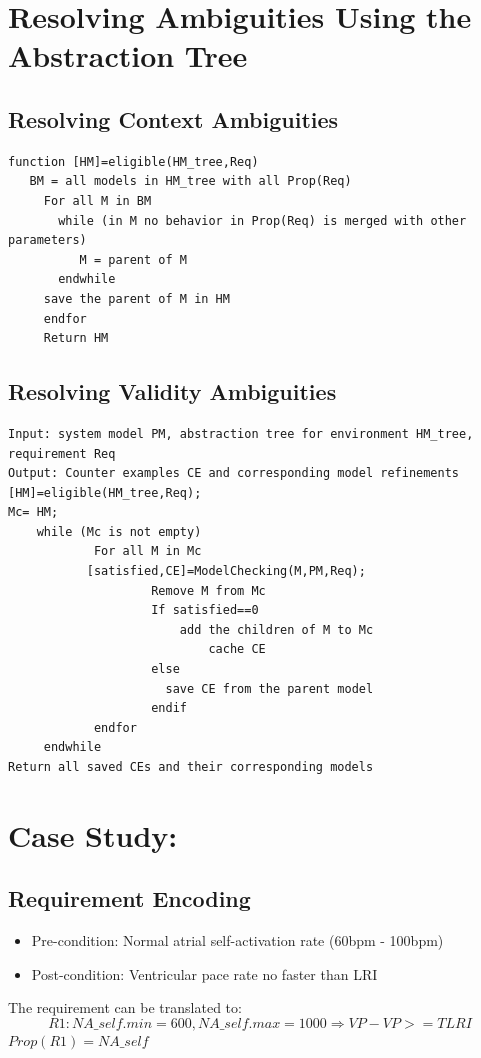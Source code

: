 \section{Resolving Ambiguities Using the Abstraction Tree}
\subsection{Resolving Context Ambiguities}
\begin{Verbatim}
function [HM]=eligible(HM_tree,Req)
   BM = all models in HM_tree with all Prop(Req)
	 For all M in BM
	   while (in M no behavior in Prop(Req) is merged with other parameters)
	      M = parent of M
	   endwhile
	 save the parent of M in HM
	 endfor
	 Return HM
\end{Verbatim}

\subsection{Resolving Validity Ambiguities}

\begin{Verbatim}
Input: system model PM, abstraction tree for environment HM_tree, requirement Req
Output: Counter examples CE and corresponding model refinements
[HM]=eligible(HM_tree,Req);
Mc= HM;
    while (Mc is not empty)
		    For all M in Mc
           [satisfied,CE]=ModelChecking(M,PM,Req);
					Remove M from Mc
					If satisfied==0
					    add the children of M to Mc
							cache CE
					else
					  save CE from the parent model
					endif
			endfor
	 endwhile
Return all saved CEs and their corresponding models
\end{Verbatim}



\section{Case Study: }
\label{contextAmbiguities}
\subsection{Requirement Encoding}
\begin{itemize}
	\item Pre-condition: Normal atrial self-activation rate (60bpm - 100bpm)
    \item Post-condition: Ventricular pace rate no faster than LRI
\end{itemize}
The requirement can be translated to:
$$R1: NA\_self.min=600,NA\_self.max=1000\Rightarrow VP-VP>=TLRI$$
$Prop(R1)=NA\_self$

